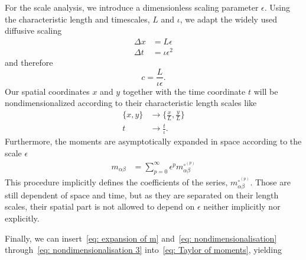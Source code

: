 For the scale analysis, we introduce a dimensionless scaling parameter $\epsilon$.
Using the characteristic length and timescales, $L$ and $\iota$, we adapt the widely used diffusive scaling
\begin{equation}
  \label{eq: nondimensionalisation}
  \begin{aligned}
    \Delta x & = L\epsilon \\
    \Delta t & = \iota\epsilon^2
  \end{aligned}
\end{equation}
and therefore
\begin{equation}
  \label{eq: nondimensionalisation 2}
  c = \frac{L}{\iota\epsilon}.
\end{equation}
Our spatial coordinates $x$ and $y$ together with the time coordinate $t$ will be nondimensionalized according to their characteristic length scales like
\begin{equation}
  \label{eq: nondimensionalisation 3}
  \begin{aligned}
    \{x, y\} & \rightarrow \{\frac{x}{L}, \frac{y}{L}\} \\
    t & \rightarrow \frac{t}{\iota}.
  \end{aligned}
\end{equation}
Furthermore, the moments are asymptotically expanded in space according to the scale $\epsilon$
\begin{align}
    \label{eq: expansion of m}
    m_{\alpha\beta} & = \sum_{p=0}^{\infty} \epsilon^p m_{\alpha\beta}^{\circ^{(p)}}
\end{align}
This procedure implicitly defines the coefficients of the series, $m_{\alpha\beta}^{\circ^{(p)}}$.
Those are still dependent of space and time, but as they are separated on their length scales, their spatial part is not allowed to depend on $\epsilon$ neither implicitly nor explicitly.

Finally, we can insert~\eqref{eq: expansion of m} and~\eqref{eq: nondimensionalisation}
through~\eqref{eq: nondimensionalisation 3} into~\eqref{eq: Taylor of moments}, yielding

